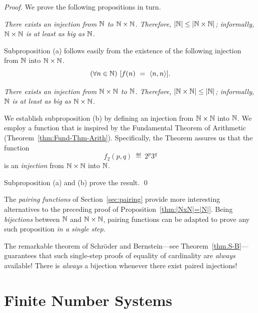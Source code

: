 \begin{proof}
We prove the following propositions in turn.

\medskip

 {\em There exists an injection from $\mathbb{N}$ to $\mathbb{N}
  \times \mathbb{N}$.  Therefore, $|\mathbb{N}| \leq |\mathbb{N} \times \mathbb{N}|$; informally, $\mathbb{N}
  \times \mathbb{N}$ is at least as big as $\mathbb{N}$.}

\smallskip

\noindent
Subproposition (a) follows easily from the existence of the following
injection from $\mathbb{N}$ into $\mathbb{N} \times \mathbb{N}$.
\[ (\forall n \in \mathbb{N}) \ [ f(n) \ = \ \langle n,n \rangle]. \]

\medskip

 {\em There exists an injection from $\mathbb{N} \times \mathbb{N}$
  to $\mathbb{N}$.  Therefore, $|\mathbb{N} \times \mathbb{N}| \leq |\mathbb{N}|$; informally, $\mathbb{N}$ is
  at least as big as $\mathbb{N} \times \mathbb{N}$.}

\smallskip

\noindent
We establish subproposition (b) by defining an injection from $\mathbb{N}
\times \mathbb{N}$ into $\mathbb{N}$.  We employ a function that is inspired by the
Fundamental Theorem of Arithmetic (Theorem~\ref{thm:Fund-Thm-Arith}).
Specifically, the Theorem assures us that the function
\[ f_2(p,q) \ \eqdef \ 2^p 3^q \]
is an {\em injection} from $\mathbb{N} \times \mathbb{N}$ into $\mathbb{N}$.

Subproposition (a) and (b) prove the result.  \qed
\end{proof}

\medskip

The {\it pairing functions} of Section~\ref{sec:pairing} provide more
interesting alternatives to the preceding proof of
Proposition~\ref{thm:|NxN|=|N|}.  Being {\em bijections} between $\mathbb{N}$
and $\mathbb{N} \times \mathbb{N}$, pairing functions can be adapted to prove any such
proposition {\em in a single step}. 

\medskip

The remarkable theorem of Schr\"{o}der and Bernstein---see
Theorem~\ref{thm.S-B}---guarantees that such single-step proofs of
equality of cardinality are {\em always} available!  There is {\em
  always} a bijection whenever there exist paired injections!

\section{Finite Number Systems}
\label{sec:congruences+modular}

